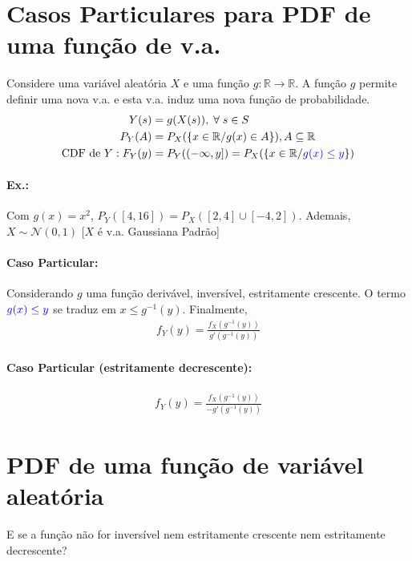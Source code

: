 \documentclass{article}
\makeatletter
\newcommand{\bb}[1]{\mathbb{#1}}
\def\mcolor#1#{\@mcolor{#1}}
\def\@mcolor#1#2#3{%
  \protect\leavevmode
  \begingroup
    \color#1{#2}#3%
  \endgroup
}
\makeatother
\begin{document}
\setlength{\abovedisplayskip}{12pt}
\setlength{\belowdisplayskip}{12pt}
\setlength{\abovedisplayshortskip}{0pt}
\setlength{\belowdisplayshortskip}{0pt}
\setlength{\jot}{1pt}

\section{Casos Particulares para PDF de uma função de v.a.}
Considere uma variável aleatória $X$ e uma função $g : \bb{R} \rightarrow \bb{R}$. A função $g$
permite definir uma nova v.a. e esta v.a. induz uma nova função de probabilidade.
\begin{align*}
    Y(s) &= g(X(s)), \; \forall \; s \in S \\
    P_Y(A) &= P_X(\{x \in \bb{R} / g(x) \in A\}), A \subseteq \bb{R} \\
    \text{CDF de }Y: F_Y(y) &= P_Y((-\infty, y]) = P_X(\{x \in \bb{R}/ \mcolor{blue}{g(x) \leq y}\})
\end{align*}
\paragraph{Ex.:} Com $g(x) = x^2$, $P_Y([4,16]) = P_X([2,4] \cup [-4,2])$. Ademais, $X \sim
\mathscr{N}(0,1)$ [$X$ é v.a. Gaussiana Padrão]

\paragraph{Caso Particular:}
Considerando $g$ uma função derivável, inversível, estritamente crescente. O termo
$\mcolor{blue}{g(x) \leq y}$ se traduz em $x \leq g^{-1}(y)$. Finalmente,
\begin{align*}
    f_Y(y) = \frac{f_X(g^{-1}(y))}{g'(g^{-1}(y))}
\end{align*}

\paragraph{Caso Particular (estritamente decrescente):}
\begin{align*}
    f_Y(y) = \frac{f_X(g^{-1}(y))}{-g'(g^{-1}(y))}
\end{align*}

\section{PDF de uma função de variável aleatória}
E se a função não for inversível nem estritamente crescente nem estritamente decrescente?
\end{document}
